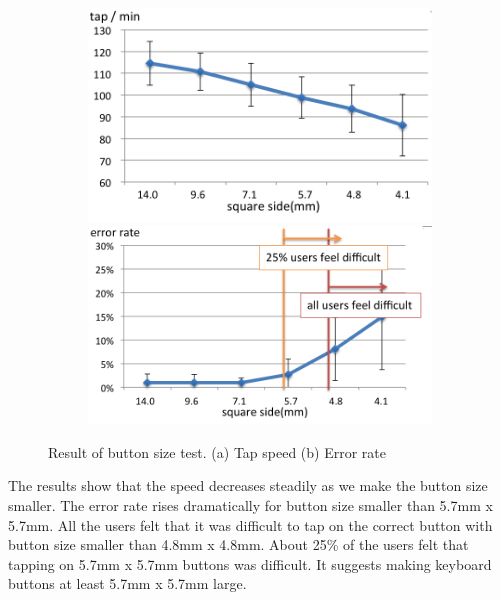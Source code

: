 \begin{figure}
  \begin{subfigure}{1\columnwidth}
  \centering
  \includegraphics[width=.8\columnwidth]{figures/F5-1.png}
  \caption{}
  \includegraphics[width=.8\columnwidth]{figures/F5-2.png}
  \caption{}
  \label{fig:f5}
  \end{subfigure}
  \caption{Result of button size test. (a) Tap speed (b) Error rate}
\end{figure}

The results show that the speed decreases steadily as we make the button size smaller. The error rate rises dramatically for button size smaller than 5.7mm x 5.7mm. All the users felt that it was difficult to tap on the correct button with button size smaller than 4.8mm x 4.8mm. About 25\% of the users felt that tapping on 5.7mm x 5.7mm buttons was difficult. It suggests making keyboard buttons at least 5.7mm x 5.7mm large.

